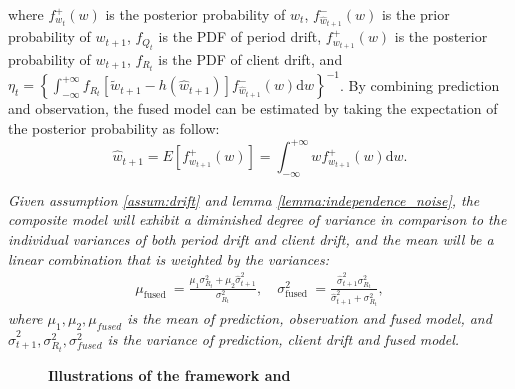 where $f_{w_t}^{+}(w)$ is the posterior probability of $w_{t}$, $f_{\hat{w}_{t+1}}^{-}(w)$ is the prior probability of $w_{t+1}$, $f_{Q_t}$ is the PDF of period drift, $f_{w_{t+1}}^{+}(w)$ is the posterior probability of $w_{t+1}$, $f_{R_t}$ is the PDF of client drift, and $\eta_t=\left\{\int_{-\infty}^{+\infty} f_{R_t}\left[\tilde{w}_{t+1}-h(\hat{w}_{t+1})\right] f_{\hat{w}_{t+1}}^{-}(w) \mathrm{d} w\right\}^{-1}$. By combining prediction and observation, the fused model can be estimated by taking the expectation of the posterior probability as follow:
\begin{equation}\label{eq:expectation}
   \hat{w}_{t+1}=E\left[f_{w_{t+1}}^{+}(w)\right]=\int_{-\infty}^{+\infty} w f_{w_{t+1}}^{+}(w) \mathrm{d} w.
   \end{equation}

\begin{theorem}\label{theorem:fused}
   \textit{Given assumption \ref{assum:drift} and lemma \ref{lemma:independence_noise}, the composite model will exhibit a diminished degree of variance in comparison to the individual variances of both period drift and client drift, and the mean will be a linear combination that is weighted by the variances:
\begin{equation}
   \begin{aligned}
   \mu_{\text {fused }}=\frac{\mu_1 \sigma_{R_t}^2+\mu_2 \hat{\sigma}^2_{t+1}}{\sigma_{R_t}^2}, \quad
   \sigma_{\text {fused }}^2=\frac{\hat{\sigma}^2_{t+1} \sigma_{R_t}^2}{\hat{\sigma}^2_{t+1}+\sigma_{R_t}^2},
   \end{aligned}
\end{equation}
where $\mu_1,\mu_2,\mu_{fused}$ is the mean of prediction, observation and fused model, and $\hat{\sigma}^2_{t+1},\sigma_{R_t}^2,\sigma_{fused}^2$ is the variance of prediction, client drift and fused model.}
\end{theorem}   
\begin{wrapfigure}{r}{0.55\textwidth}
   \vspace{-3mm}
   \centering
   \caption{\small\textbf{Illustrations of the framework and \fedeve}}
   \vspace{-3mm}
\end{wrapfigure}

